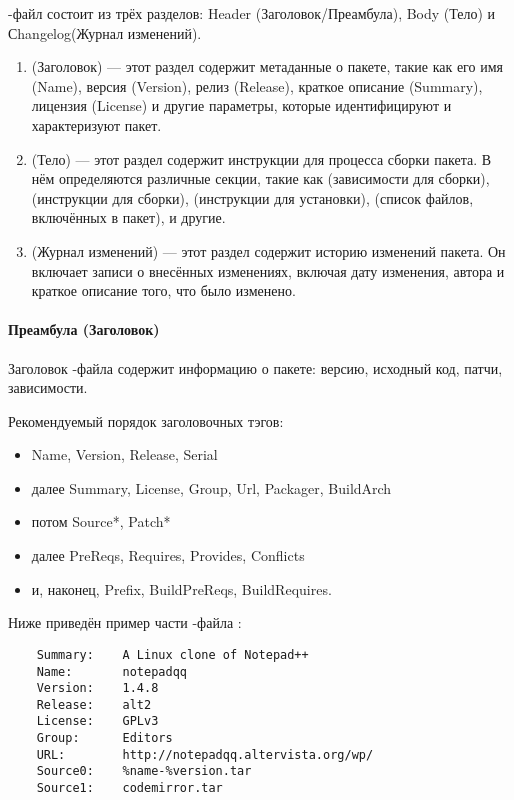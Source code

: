 -файл состоит из трёх разделов: Header (Заголовок/Преамбула), Body (Тело) и Сhangelog(Журнал изменений).
\begin{enumerate}
	\item {} (Заголовок) --- этот раздел содержит метаданные о пакете, такие как его имя (Name), 
		версия (Version), релиз (Release), краткое описание (Summary), лицензия (License) и другие 
		параметры, которые идентифицируют и характеризуют пакет.
	\item {} (Тело) --- этот раздел содержит инструкции для процесса сборки пакета. В нём 
		определяются различные секции, такие как  (зависимости для сборки), 
		 (инструкции для сборки),  (инструкции для установки), 
		 (список файлов, включённых в пакет), и другие.	
	\item {} (Журнал изменений) --- этот раздел содержит историю изменений пакета. 
		Он включает записи о внесённых изменениях, включая дату изменения, автора и краткое 
		описание того, что было изменено.
\end{enumerate}

\paragraph{Преамбула (Заголовок)}
Заголовок -файла содержит информацию о пакете: версию, исходный код, патчи, зависимости.

Рекомендуемый порядок заголовочных тэгов:
\begin{itemize}
	\item Name, Version, Release, Serial
	\item далее Summary, License, Group, Url, Packager, BuildArch
	\item потом Source*, Patch*
	\item далее PreReqs, Requires, Provides, Conflicts
	\item и, наконец, Prefix, BuildPreReqs, BuildRequires.
\end{itemize}

Ниже приведён пример части -файла :
\begin{verbatim}
	Summary:	A Linux clone of Notepad++
	Name:		notepadqq
	Version:	1.4.8
	Release:	alt2
	License:	GPLv3
	Group:		Editors
	URL:		http://notepadqq.altervista.org/wp/
	Source0:	%name-%version.tar
	Source1:	codemirror.tar
\end{verbatim}


